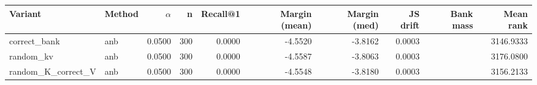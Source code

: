 \begin{tabular}{l l r r r r r r r r}
\toprule
Variant & Method & $\alpha$ & n & Recall@1 & Margin (mean) & Margin (med) & JS drift & Bank mass & Mean rank \\
\midrule
correct\_bank & anb & 0.0500 & 300 & 0.0000 & -4.5520 & -3.8162 & 0.0003 &  & 3146.9333 \\
random\_kv & anb & 0.0500 & 300 & 0.0000 & -4.5587 & -3.8063 & 0.0003 &  & 3176.0800 \\
random\_K\_correct\_V & anb & 0.0500 & 300 & 0.0000 & -4.5548 & -3.8180 & 0.0003 &  & 3156.2133 \\
\bottomrule
\end{tabular}
